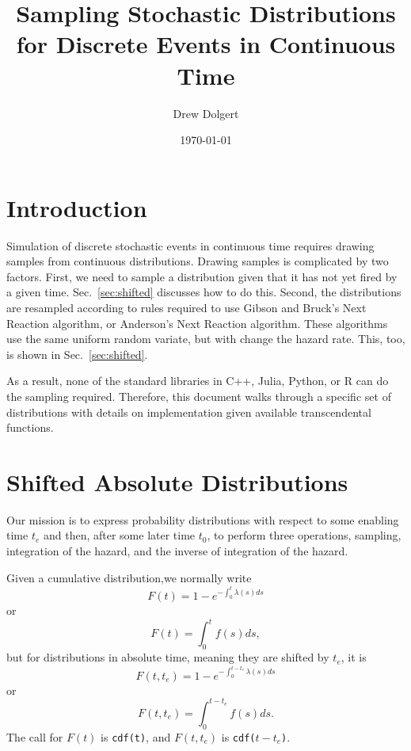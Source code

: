 \documentclass{article}
\title{Sampling Stochastic Distributions for Discrete Events in Continuous Time}
\author{Drew Dolgert}
\date{\today}
\newcommand{\code}[1]{\texttt{#1}}
\begin{document}
\maketitle


\section{Introduction}
Simulation of discrete stochastic events in continuous time requires
drawing samples from continuous distributions. Drawing samples
is complicated by two factors. First,
we need to sample a distribution given that it has not yet fired
by a given time. Sec.~\ref{sec:shifted} discusses how to do this.
Second, the distributions are resampled according to rules required
to use Gibson and Bruck's Next Reaction algorithm, or Anderson's Next
Reaction algorithm. These algorithms use the same uniform
random variate, but with change the hazard rate.
This, too, is shown in Sec.~\ref{sec:shifted}.

As a result, none of the standard libraries in C++, Julia,
Python, or R can do the sampling required. Therefore, this
document walks through a specific set of distributions
with details on implementation given available transcendental functions.

\tableofcontents

\section{Shifted Absolute Distributions\label{sec:shifted}}
Our mission is to express probability distributions
with respect to some enabling time $t_e$ and then, after
some later time $t_0$, to perform three operations, sampling,
integration of the hazard, and the inverse of integration of
the hazard.

Given a cumulative distribution,we normally write
\begin{equation}
  F(t)=1-e^{-\int_{0}^t \lambda(s)ds}\label{eqn:simplecdf}
\end{equation}
or
\begin{equation}
  F(t)=\int_0^t f(s)ds,
\end{equation}
but for distributions in absolute time, meaning they are shifted
by $t_e$, it is
\begin{equation}
  F(t,t_e)=1-e^{-\int_{0}^{t-t_e} \lambda(s)ds}
\end{equation}
or
\begin{equation}
  F(t,t_e)=\int_{0}^{t-t_e} f(s)ds.
\end{equation}
The call for $F(t)$ is \code{cdf(t)}, and $F(t,t_e)$ is \code{cdf($t-t_e$)}.
\end{document}
